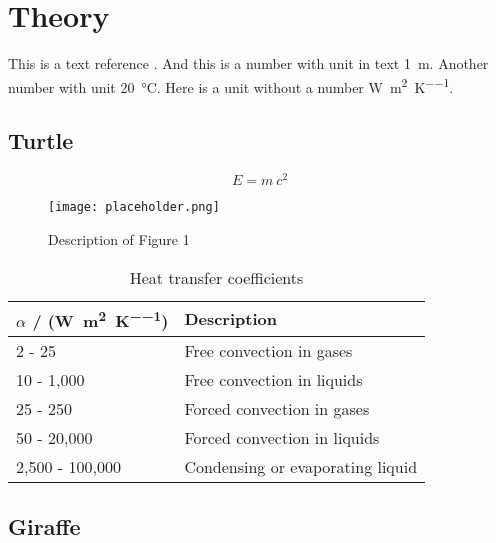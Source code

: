 \chapter{Theory}\label{sec:theory}

This is a text reference \cite{Klement.2021}. And this is a number with unit in text \SI{1}{\metre}. Another number with unit \SI{20}{\celsius}. Here is a unit without a number \si{\watt\per\square\metre\per\kelvin}.


\section{Turtle}\label{sec:turtle}
\lipsum[2-4]

\begin{equation}
  E = m\ c^2
  \label{eq:equation1}
\end{equation}

\begin{figure}[h]
  \centering
  \texttt{[image: placeholder.png]}
  \caption{Description of Figure 1}\label{fig:figure1}
\end{figure}

\begin{table}[h]
  \centering
  \begin{tabular}[]{l l}
    \toprule
    $\alpha$ / (\si{\watt\per\square\metre\per\kelvin}) & Description                      \\
    \midrule
    2 - 25                                              & Free convection in gases         \\
    10 - 1,000                                          & Free convection in liquids       \\
    25 - 250                                            & Forced convection in gases       \\
    50 - 20,000                                         & Forced convection in liquids     \\
    2,500 - 100,000                                     & Condensing or evaporating liquid \\
    \bottomrule
  \end{tabular}
  \caption{Heat transfer coefficients\cite{VDIGesellschaftVerfahrenstechnikundChemieingenieurwesen.2013}}\label{tab:alphaValues}
\end{table}

\section{Giraffe}\label{subsec:Giraffe}
\lipsum[2-4]

